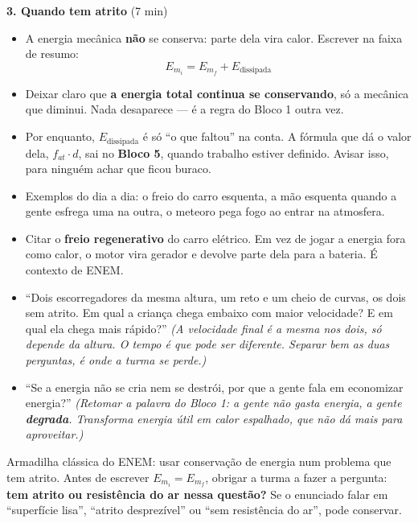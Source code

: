 \documentclass[11pt,a4paper]{article}
\begin{document}
\begin{quadro}
\medskip
\textbf{3. Quando tem atrito} (7 min)
\begin{itemize}[nosep]
  \item A energia mec\^anica \textbf{n\~ao} se conserva: parte dela
        vira calor. Escrever na faixa de resumo:
  \[
    \boxed{E_{m_i} = E_{m_f} + E_{\text{dissipada}}}
  \]
  \item Deixar claro que \textbf{a energia total continua se
        conservando}, s\'o a mec\^anica que diminui. Nada desaparece
        --- \'e a regra do Bloco 1 outra vez.
  \item Por enquanto, $E_{\text{dissipada}}$ \'e s\'o ``o que faltou''
        na conta. A f\'ormula que d\'a o valor dela,
        $f_{at}\cdot d$, sai no \textbf{Bloco 5}, quando trabalho
        estiver definido. Avisar isso, para ningu\'em achar que ficou
        buraco.
  \item Exemplos do dia a dia: o freio do carro esquenta, a m\~ao
        esquenta quando a gente esfrega uma na outra, o meteoro pega
        fogo ao entrar na atmosfera.
  \item Citar o \textbf{freio regenerativo} do carro el\'etrico. Em vez
        de jogar a energia fora como calor, o motor vira gerador e
        devolve parte dela para a bateria. \'E contexto de ENEM.
\end{itemize}
\end{quadro}

\begin{perguntas}
\begin{itemize}[nosep]
  \item ``Dois escorregadores da mesma altura, um reto e um cheio de
        curvas, os dois sem atrito. Em qual a crian\c{c}a chega embaixo
        com maior velocidade? E em qual ela chega mais r\'apido?''
        \textit{(A velocidade final \'e a mesma nos dois, s\'o depende
        da altura. O tempo \'e que pode ser diferente. Separar bem as
        duas perguntas, \'e onde a turma se perde.)}
  \item ``Se a energia n\~ao se cria nem se destr\'oi, por que a gente
        fala em economizar energia?''
        \textit{(Retomar a palavra do Bloco 1: a gente n\~ao gasta
        energia, a gente \textbf{degrada}. Transforma energia \'util em
        calor espalhado, que n\~ao d\'a mais para aproveitar.)}
\end{itemize}
\end{perguntas}

\begin{obs}
Armadilha cl\'assica do ENEM: usar conserva\c{c}\~ao de energia num
problema que tem atrito. Antes de escrever $E_{m_i} = E_{m_f}$, obrigar
a turma a fazer a pergunta: \textbf{tem atrito ou resist\^encia do ar
nessa quest\~ao?} Se o enunciado falar em ``superf\'icie lisa'',
``atrito desprez\'ivel'' ou ``sem resist\^encia do ar'', pode
conservar.
\end{obs}
\end{document}

